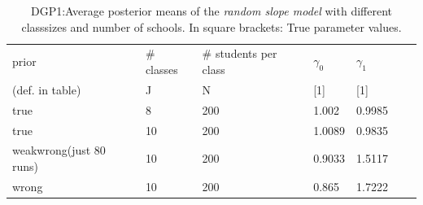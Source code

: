 \begin{table}[H]
\begin{center}
\begin{tabular}{l  l  l  l  l  l  l  }
prior & \# classes & \#  students per class & $\gamma_0$ & $\gamma_1$\\
(def. in table)  & J  & N &  [1] &  [1] \\
\hline
true & 8  &  200  &  1.002  &  0.9985 \\
true & 10  &  200  &  1.0089  &  0.9835 \\
weakwrong(just 80 runs) & 10  &  200  &  0.9033  &  1.5117\\
wrong & 10  &  200  &  0.865  &  1.7222\\
\end{tabular}
\end{center}
\caption{DGP1:Average posterior means of the \emph{random slope model} with different classsizes and number of schools. In square brackets: True parameter values.}
\label{tab:bias_first}
\end{table}

